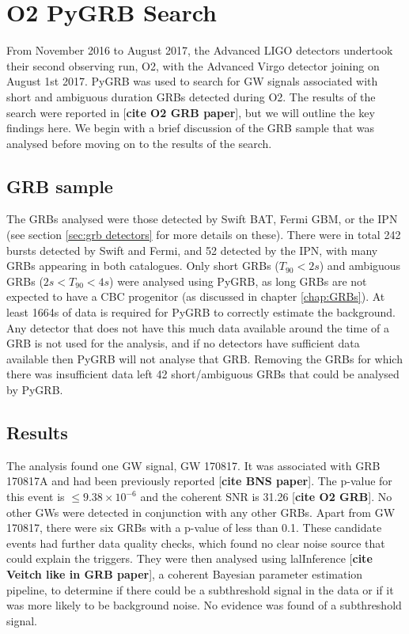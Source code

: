 \documentclass[11pt]{cuthesis}
\begin{document}
\section{O2 PyGRB Search} \label{sec:pygrb o2 results}
From November 2016 to August 2017, the Advanced LIGO detectors undertook their second observing run, O2, with the Advanced Virgo detector joining on August 1st 2017. PyGRB was used to search for GW signals associated with short and ambiguous duration GRBs detected during O2. The results of the search were reported in [\textbf{cite O2 GRB paper}], but we will outline the key findings here. We begin with a brief discussion of the GRB sample that was analysed before moving on to the results of the search.

\subsection{GRB sample}
The GRBs analysed were those detected by Swift BAT, Fermi GBM, or the IPN (see section \ref{sec:grb detectors} for more details on these). There were in total 242 bursts detected by Swift and Fermi, and 52 detected by the IPN, with many GRBs appearing in both catalogues. Only short GRBs ($T_{90}<2s$) and ambiguous GRBs ($2s<T_{90}<4s$) were analysed using PyGRB, as long GRBs are not expected to have a CBC progenitor (as discussed in chapter \ref{chap:GRBs}). At least 1664s of data is required for PyGRB to correctly estimate the background. Any detector that does not have this much data available around the time of a GRB is not used for the analysis, and if no detectors have sufficient data available then PyGRB will not analyse that GRB. Removing the GRBs for which there was insufficient data left 42 short/ambiguous GRBs that could be analysed by PyGRB.


\subsection{Results}
The analysis found one GW signal, GW 170817. It was associated with GRB 170817A and had been previously reported [\textbf{cite BNS paper}]. The p-value for this event is $\leq 9.38 \times 10^{-6}$ and the coherent SNR is 31.26 [\textbf{cite O2 GRB}]. No other GWs were detected in conjunction with any other GRBs. Apart from GW 170817, there were six GRBs with a p-value of less than 0.1. These candidate events had further data quality checks, which found no clear noise source that could explain the triggers. They were then analysed using lalInference [\textbf{cite Veitch like in GRB paper}], a coherent Bayesian parameter estimation pipeline, to determine if there could be a subthreshold signal in the data or if it was more likely to be background noise. No evidence was found of a subthreshold signal. 
\end{document}
